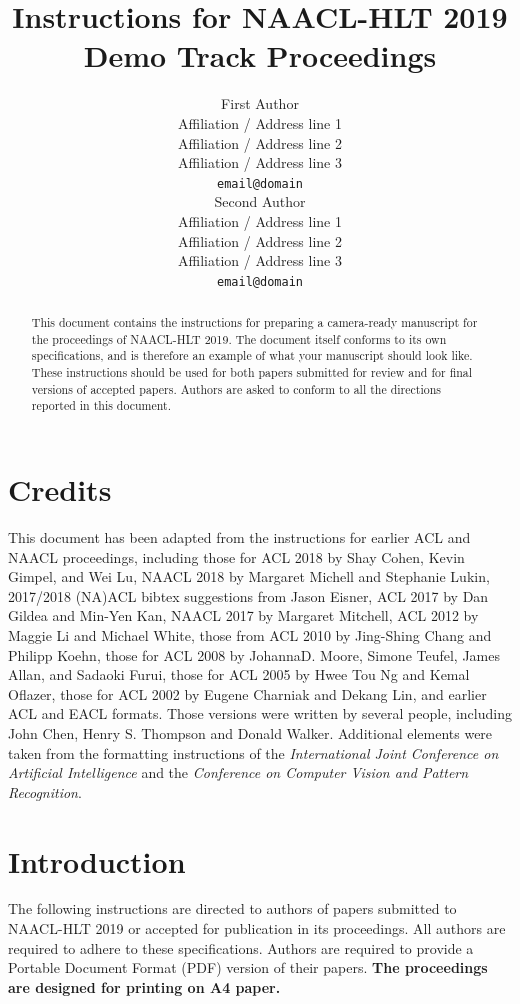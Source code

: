 \documentclass[11pt,a4paper]{article}
\title{Instructions for NAACL-HLT 2019 Demo Track Proceedings}
\author{First Author \\
  Affiliation / Address line 1 \\
  Affiliation / Address line 2 \\
  Affiliation / Address line 3 \\
  {\tt email@domain} \\\And
  Second Author \\
  Affiliation / Address line 1 \\
  Affiliation / Address line 2 \\
  Affiliation / Address line 3 \\
  {\tt email@domain} \\}
\date{}
\begin{document}
\maketitle
\begin{abstract}
  This document contains the instructions for preparing a camera-ready
  manuscript for the proceedings of NAACL-HLT 2019. The document itself
  conforms to its own specifications, and is therefore an example of
  what your manuscript should look like. These instructions should be
  used for both papers submitted for review and for final versions of
  accepted papers.  Authors are asked to conform to all the directions
  reported in this document.
\end{abstract}

\section{Credits}

This document has been adapted from the instructions
for earlier ACL and NAACL proceedings,
including 
those for ACL 2018 by Shay Cohen, Kevin Gimpel, and Wei Lu, 
NAACL 2018 by Margaret Michell and Stephanie Lukin,
2017/2018 (NA)ACL bibtex suggestions from Jason Eisner,
ACL 2017 by Dan Gildea and Min-Yen Kan, 
NAACL 2017 by Margaret Mitchell, 
ACL 2012 by Maggie Li and Michael White, 
those from ACL 2010 by Jing-Shing Chang and Philipp Koehn, 
those for ACL 2008 by JohannaD. Moore, Simone Teufel, James Allan, and Sadaoki Furui, 
those for ACL 2005 by Hwee Tou Ng and Kemal Oflazer, 
those for ACL 2002 by Eugene Charniak and Dekang Lin, 
and earlier ACL and EACL formats.
Those versions were written by several
people, including John Chen, Henry S. Thompson and Donald
Walker. Additional elements were taken from the formatting
instructions of the {\em International Joint Conference on Artificial
  Intelligence} and the \emph{Conference on Computer Vision and
  Pattern Recognition}.

\section{Introduction}

The following instructions are directed to authors of papers submitted
to NAACL-HLT 2019 or accepted for publication in its proceedings. All
authors are required to adhere to these specifications. Authors are
required to provide a Portable Document Format (PDF) version of their
papers. \textbf{The proceedings are designed for printing on A4
paper.}
\end{document}
